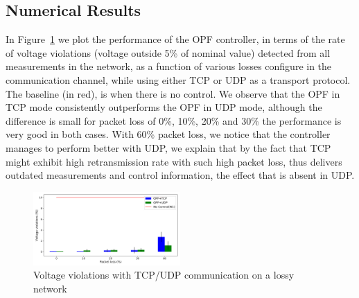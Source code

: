 \documentclass[conference]{IEEEtran}
\begin{document}
\subsection{Numerical Results}




In Figure~\ref{bars_loss} we plot the performance of the OPF controller, in terms of the rate of voltage violations (voltage outside 5\% of nominal value) detected from all measurements in the network, as a function of various losses configure in the communication channel, while using either TCP or UDP as a transport protocol.
The baseline (in red), is when there is no control. We observe that the OPF in TCP mode consistently outperforms the OPF in UDP mode, although the difference is small for packet loss of 0\%, 10\%, 20\% and 30\% the performance is very good in both cases. With 60\% packet loss, we notice that the controller manages to perform better with UDP, we explain that by the fact that TCP might exhibit high retransmission rate with such high packet loss, thus delivers outdated measurements and control information, the effect that is absent in UDP.

\begin{figure}[ht]
	\centering
	\includegraphics[width=0.5\textwidth]{bars_loss.png}
	\caption{Voltage violations with TCP/UDP communication on a lossy network}
	\label{bars_loss}
\end{figure}
\end{document}
